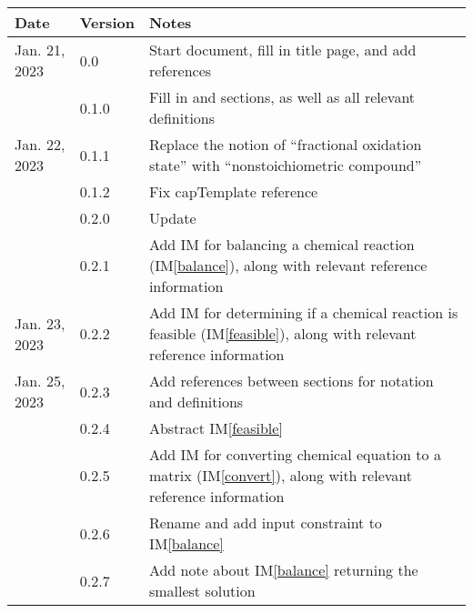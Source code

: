 \documentclass[12pt]{article}
\newcommand{\iref}[1]{IM\ref{#1}}
\begin{document}
\begin{tabularx}{\textwidth}{p{2.5cm}p{1.5cm}X}
  \toprule {\bf Date} & {\bf Version} & {\bf Notes}                                                          \\
  \midrule
  Jan. 21, 2023       & 0.0           & Start document, fill in title page, and add references               \\
                      & 0.1.0         & Fill in \nameref{sec_probDesc} and \nameref{sec_goals} sections, as
  well as all relevant definitions                                                                           \\
  Jan. 22, 2023       & 0.1.1         & Replace the notion of ``fractional oxidation state'' with
  ``nonstoichiometric compound''                                                                             \\
                      & 0.1.2         & Fix capTemplate reference                                            \\
                      & 0.2.0         & Update \nameref{srs_sec_abbsAcrs}                                    \\
                      & 0.2.1         & Add IM for balancing a chemical reaction (\iref{balance}), along
  with relevant reference information                                                                        \\
  Jan. 23, 2023       & 0.2.2         & Add IM for determining if a chemical reaction is feasible
  (\iref{feasible}), along with relevant reference information                                               \\
  Jan. 25, 2023       & 0.2.3         & Add references between sections for notation and
  definitions                                                                                                \\
                      & 0.2.4         & Abstract \iref{feasible}                                             \\
                      & 0.2.5         & Add IM for converting chemical equation to a matrix
  (\iref{convert}), along with relevant reference information                                                \\
                      & 0.2.6         & Rename and add input constraint to \iref{balance}                    \\
                      & 0.2.7         & Add note about \iref{balance} returning the smallest solution        \\

\end{tabularx}
\end{document}
